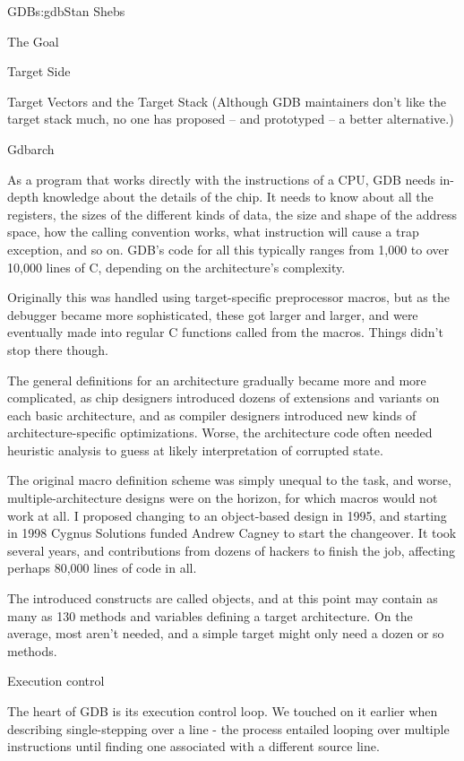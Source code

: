 \begin{aosachapter}{GDB}{s:gdb}{Stan Shebs}
\begin{aosasect1}{The Goal}
\begin{aosasect1}{Target Side}
\begin{aosasect2}{Target Vectors and the Target Stack}
(Although GDB maintainers don't like the target stack much, no one has
proposed -- and prototyped -- a better alternative.)

\end{aosasect2}

\begin{aosasect2}{Gdbarch}

As a program that works directly with the instructions of a CPU, GDB
needs in-depth knowledge about the details of the chip.  It needs to
know about all the registers, the sizes of the different kinds of
data, the size and shape of the address space, how the calling
convention works, what instruction will cause a trap exception, and so
on.  GDB's code for all this typically ranges from 1,000 to over
10,000 lines of C, depending on the architecture's complexity.

Originally this was handled using target-specific preprocessor macros,
but as the debugger became more sophisticated, these got larger and
larger, and were eventually made into regular C functions called from
the macros.  Things didn't stop there though.

The general definitions for an architecture gradually became more and
more complicated, as chip designers introduced dozens of extensions
and variants on each basic architecture, and as compiler designers
introduced new kinds of architecture-specific optimizations.  Worse,
the architecture code often needed heuristic analysis to guess at
likely interpretation of corrupted state.

The original macro definition scheme was simply unequal to the task,
and worse, multiple-architecture designs were on the horizon, for
which macros would not work at all.  I proposed changing to an
object-based design in 1995, and starting in 1998 Cygnus Solutions
funded Andrew Cagney to start the changeover.  It took several years,
and contributions from dozens of hackers to finish the job, affecting
perhaps 80,000 lines of code in all.

The introduced constructs are called  objects, and at
this point may contain as many as 130 methods and variables defining
a target architecture.  On the average, most aren't needed, and a
simple target might only need a dozen or so methods.

\end{aosasect2}

\begin{aosasect2}{Execution control}

The heart of GDB is its execution control loop.  We touched on it earlier
when describing single-stepping over a line - the process entailed looping
over multiple instructions until finding one associated with a different
source line.


\end{aosasect2}
\end{aosasect1}
\end{aosasect1}
\end{aosachapter}
